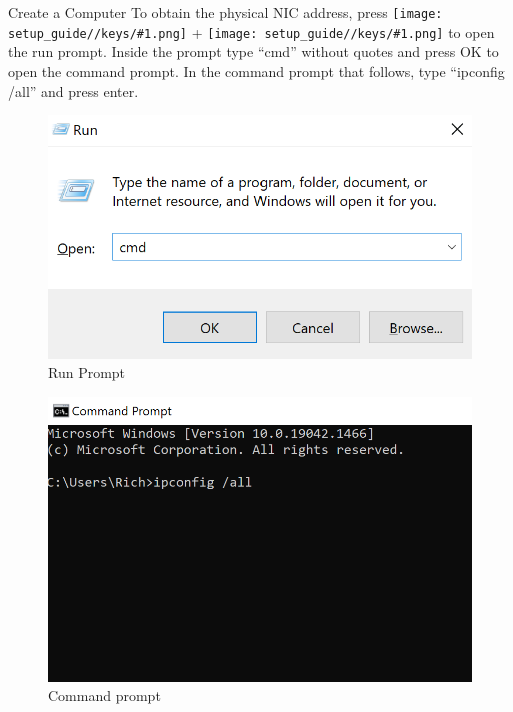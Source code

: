 \documentclass[fleqn]{beamer}
\newcommand{\quotes}[1]{``#1''}
\newcommand{\drawkey}[1]{%
  \begingroup\normalfont
  \texttt{[image: setup\_guide//keys/\#1.png]}%
  \endgroup
}
\begin{document}
\begin{frame}{Create a Computer}
    To obtain the physical NIC address, press \drawkey{win} + \drawkey{R} to open the run prompt. Inside the prompt type \quotes{cmd} without quotes and press OK to open the command prompt. In the command prompt that follows, type \quotes{ipconfig /all} and press enter.
    \begin{multicols}{2}
        \begin{figure}
            \centering
            \includegraphics[scale=.5]{figures/runcmd.png}
            \caption{Run Prompt}
            \label{fig:my_label}
        \end{figure}
        \begin{figure}
            \centering
            \includegraphics[scale=.5]{figures/cmd.png}
            \caption{Command prompt}
            \label{fig:my_label}
        \end{figure}
    \end{multicols}
\end{frame}
\end{document}
